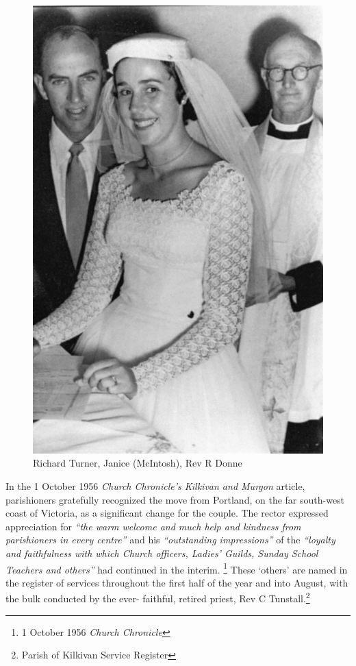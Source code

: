 \begin{figure}
\begin{center}
\includegraphics[width=1.\linewidth,center]{../images/Donne.jpg}
\caption{Richard Turner, Janice (McIntosh), Rev R Donne}
\end{center}
\end{figure}




In the 1 October 1956 \emph{Church Chronicle's Kilkivan and Murgon} article, parishioners gratefully recognized the move from Portland, on the far south-west coast of Victoria, as a significant change for the couple. The rector expressed appreciation for \emph{``the warm welcome and much help and kindness from parishioners in every centre''} and his \emph{``outstanding impressions''} of the \emph{``loyalty and faithfulness with which Church officers, Ladies' Guilds, Sunday School Teachers and others''} had continued in the interim. \footnote{1 October 1956 \emph{Church Chronicle}} These `others' are named in the register of services throughout the first half of the year and into August, with the bulk conducted by the ever- faithful, retired priest, Rev C Tunstall.\footnote{Parish of Kilkivan Service Register}


